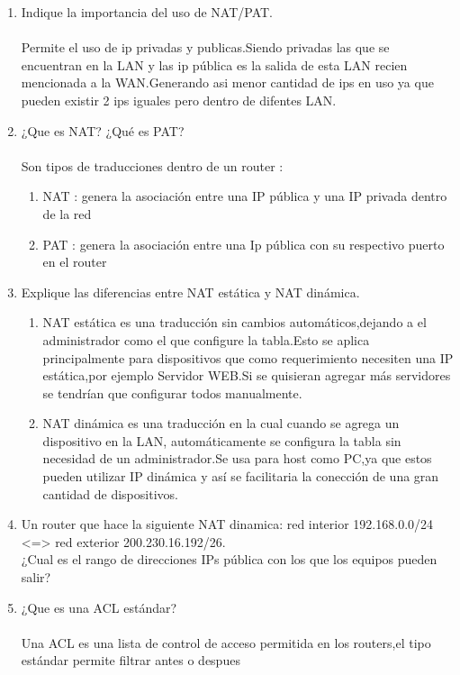 \documentclass{udparticle}
\begin{document}
\begin{enumerate}
\item Indique la importancia del uso de NAT/PAT.\\\\
Permite el uso de ip privadas y publicas.Siendo privadas las que se encuentran en la LAN y las ip pública es la
salida de esta LAN recien mencionada a la WAN.Generando asi menor cantidad de ips en uso ya que pueden existir
2 ips iguales pero dentro de difentes LAN.
\item ¿Que es NAT? ¿Qué es PAT?\\\\
Son tipos de traducciones dentro de un router :
\begin{enumerate}
	\item NAT : genera la asociación entre una IP pública y una IP privada dentro de la red
	\item PAT : genera la asociación entre una Ip pública con su respectivo puerto en el router
\end{enumerate}
\item Explique las diferencias entre NAT estática y NAT dinámica.
\begin{enumerate}
\item NAT estática es una traducción sin cambios automáticos,dejando a el administrador como
el que configure la tabla.Esto se aplica principalmente para dispositivos que como requerimiento
necesiten una IP estática,por ejemplo Servidor WEB.Si se quisieran agregar más servidores se tendrían que 
configurar todos manualmente.\\
\item NAT dinámica es una traducción en la cual cuando se agrega un dispositivo en la LAN, automáticamente
se configura la tabla sin necesidad de un administrador.Se usa para host como PC,ya que estos pueden utilizar
IP dinámica y así se facilitaria la conección de una gran cantidad de dispositivos.\\
\end{enumerate}
\item Un router que hace la siguiente NAT dinamica: red interior 
192.168.0.0/24 <=> red exterior 200.230.16.192/26.\\
¿Cual es el rango de direcciones IPs pública con los que los equipos 
pueden salir?
\item ¿Que es una ACL estándar?\\\\
Una ACL es una lista de control de acceso permitida en los routers,el tipo estándar permite filtrar antes o despues 

\end{enumerate}
\end{document}
